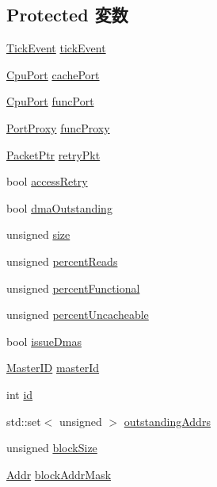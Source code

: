 \subsection*{Protected 変数}
\begin{DoxyCompactItemize}
\item 
\hyperlink{classMemTest_1_1TickEvent}{TickEvent} \hyperlink{classMemTest_aa36b8e894416f0ec98f701ab08f2ac22}{tickEvent}
\item 
\hyperlink{classMemTest_1_1CpuPort}{CpuPort} \hyperlink{classMemTest_a9529cc9b43e49c677df49655a2dcae59}{cachePort}
\item 
\hyperlink{classMemTest_1_1CpuPort}{CpuPort} \hyperlink{classMemTest_ae15ac85298e9af5a2c9235648142038c}{funcPort}
\item 
\hyperlink{classPortProxy}{PortProxy} \hyperlink{classMemTest_a9ac4a204ae63e4b0faa0de1494001ad1}{funcProxy}
\item 
\hyperlink{classPacket}{PacketPtr} \hyperlink{classMemTest_a314ae93c04b3ca96e79e1b1f39a8e478}{retryPkt}
\item 
bool \hyperlink{classMemTest_ad5bf7786dfa39d56df912238c9440d29}{accessRetry}
\item 
bool \hyperlink{classMemTest_ab1e2d7543dee7540da2f77f9c021b200}{dmaOutstanding}
\item 
unsigned \hyperlink{classMemTest_a245260f6f74972558f61b85227df5aae}{size}
\item 
unsigned \hyperlink{classMemTest_ad154c2c04ac9a3233fec090cc4ef9e62}{percentReads}
\item 
unsigned \hyperlink{classMemTest_a610799cbc3661025682ac441b64e1f5b}{percentFunctional}
\item 
unsigned \hyperlink{classMemTest_aadfb1913bfffe90c30ba7ecff262c25e}{percentUncacheable}
\item 
bool \hyperlink{classMemTest_a8519fa2de8677d71f7a76d5e6696f1fd}{issueDmas}
\item 
\hyperlink{request_8hh_ac366b729262fd8e7cbd3283da6f775cf}{MasterID} \hyperlink{classMemTest_a96ec6a422ac492d05f8b3edc5b58532b}{masterId}
\item 
int \hyperlink{classMemTest_a7441ef0865bcb3db9b8064dd7375c1ea}{id}
\item 
std::set$<$ unsigned $>$ \hyperlink{classMemTest_a45c00cfc104db07c25492851538a4659}{outstandingAddrs}
\item 
unsigned \hyperlink{classMemTest_a5ac9071f2dc21549be52e298e877d8ab}{blockSize}
\item 
\hyperlink{base_2types_8hh_af1bb03d6a4ee096394a6749f0a169232}{Addr} \hyperlink{classMemTest_a6a8310b55ab96dd81aafe314bf214807}{blockAddrMask}

\end{DoxyCompactItemize}
